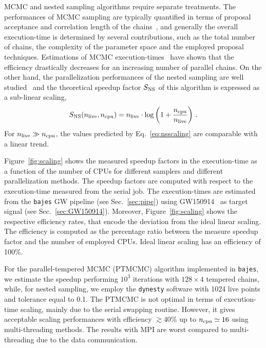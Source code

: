 \documentclass[prd,aps,twocolumn,a4paper,showkeys,nofootinbib,floatfix]{revtex4-1}
\newcommand{\be}{\begin{equation}}
\newcommand{\ee}{\end{equation}}
\newcommand{\bajes}{{\tt bajes}}
\begin{document}
MCMC and nested sampling algorithms require separate treatments.
The performances of MCMC sampling are typically quantified 
in terms of proposal acceptance and 
correlation length of the chains~\cite{JSSv035i04,solonen2012,Foreman_Mackey_2013,Veitch:2014wba,Li_2014,Vousden_2015},
and generally the overall execution-time is determined 
by several contributions, 
such as the total number of chains,
the complexity of the parameter space and the employed proposal techniques.
Estimations of MCMC execution-times~\cite{sukys2017spux,robert2018accelerating,morzfeld2019localization} have shown that the efficiency
drastically decreases for an increasing number of parallel chains.
On the other hand, the parallelization performances of the nested sampling 
are well studied~\cite{feroz2008,Handley_2015,Brewer:2016scw, Higson_2018, Smith:2019ucc}
and the theoretical speedup factor $S_{\rm NS}$ of this algorithm
is expressed as a sub-linear scaling,
\be
\label{eq:nsscaling}
S_{\rm NS} (n_{\rm live},n_{\rm cpu}) = n_{\rm live}\cdot \log\left(1+\frac{n_{\rm cpu}}{n_{\rm live}}\right)\,.
\ee
For $n_{\rm live} \gg n_{\rm cpu}$, the values predicted by Eq.~\eqref{eq:nsscaling} are comparable with a linear trend.

Figure~\ref{fig:scaling}
shows the measured speedup factors in the execution-time
as a function of the number of CPUs
for different samplers and different parallelization methods.
The speedup factors are computed with respect to the execution-time
measured from the serial job.
The execution-times are estimated from
 the {\bajes} GW pipeline (see Sec.~\ref{sec:pipe})
 using GW150914~\cite{Abbott:2016blz} as target signal (see Sec.~\ref{sec:GW150914}).
 Moreover, Figure~\ref{fig:scaling} shows the respective efficiency rates, 
 that encode the deviation from the ideal linear scaling.
 The efficiency is computed as the percentage 
 ratio between the measure speedup 
 factor and the number of employed CPUs.
 Ideal linear scaling has an efficiency of 100\%.
 
 For the parallel-tempered MCMC (PTMCMC)
 algorithm implemented in {\tt bajes}, we estimate the speedup performing $10^3$ iterations
 with $128\times 4$ tempered chains, while, for nested sampling,
 we employ the {\tt dynesty} software
 with 1024 live points and tolerance equal to 0.1.
 The PTMCMC is not optimal in terms of execution-time scaling,
 mainly due to the serial swapping routine. 
 However, 
 it gives acceptable scaling performances
 with efficiency $\gtrsim 40\%$ up to $n_{\rm cpu} \simeq 16$ using multi-threading methods.
 The results with MPI are worst compared to
 multi-threading
 due to the data communication.
 
\end{document}
